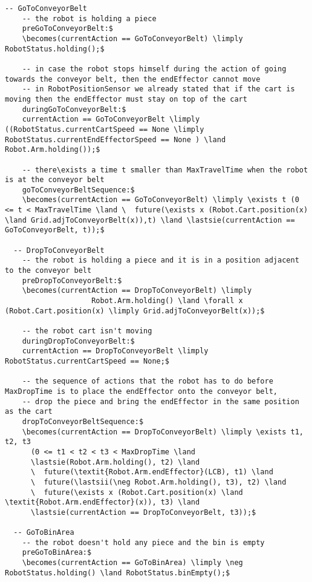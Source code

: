 \begin{lstlisting}[fontadjust, mathescape, frame=single]
  -- GoToConveyorBelt
    -- the robot is holding a piece
    preGoToConveyorBelt:$
    \becomes(currentAction == GoToConveyorBelt) \limply RobotStatus.holding();$
    
    -- in case the robot stops himself during the action of going towards the conveyor belt, then the endEffector cannot move
    -- in RobotPositionSensor we already stated that if the cart is moving then the endEffector must stay on top of the cart
    duringGoToConveyorBelt:$
    currentAction == GoToConveyorBelt \limply ((RobotStatus.currentCartSpeed == None \limply RobotStatus.currentEndEffectorSpeed == None ) \land Robot.Arm.holding());$

    -- there\exists a time t smaller than MaxTravelTime when the robot is at the conveyor belt
    goToConveyorBeltSequence:$
    \becomes(currentAction == GoToConveyorBelt) \limply \exists t (0 <= t < MaxTravelTime \land \  future(\exists x (Robot.Cart.position(x) \land Grid.adjToConveyorBelt(x)),t) \land \lastsie(currentAction == GoToConveyorBelt, t));$
    
  -- DropToConveyorBelt
    -- the robot is holding a piece and it is in a position adjacent to the conveyor belt
    preDropToConveyorBelt:$
    \becomes(currentAction == DropToConveyorBelt) \limply
                    Robot.Arm.holding() \land \forall x (Robot.Cart.position(x) \limply Grid.adjToConveyorBelt(x));$
    
    -- the robot cart isn't moving
    duringDropToConveyorBelt:$
    currentAction == DropToConveyorBelt \limply RobotStatus.currentCartSpeed == None;$

    -- the sequence of actions that the robot has to do before MaxDropTime is to place the endEffector onto the conveyor belt,
    -- drop the piece and bring the endEffector in the same position as the cart
    dropToConveyorBeltSequence:$
    \becomes(currentAction == DropToConveyorBelt) \limply \exists t1, t2, t3
      (0 <= t1 < t2 < t3 < MaxDropTime \land
      \lastsie(Robot.Arm.holding(), t2) \land
      \  future(\textit{Robot.Arm.endEffector}(LCB), t1) \land
      \  future(\lastsii(\neg Robot.Arm.holding(), t3), t2) \land
      \  future(\exists x (Robot.Cart.position(x) \land \textit{Robot.Arm.endEffector}(x)), t3) \land
      \lastsie(currentAction == DropToConveyorBelt, t3));$

  -- GoToBinArea
    -- the robot doesn't hold any piece and the bin is empty
    preGoToBinArea:$
    \becomes(currentAction == GoToBinArea) \limply \neg RobotStatus.holding() \land RobotStatus.binEmpty();$
    

\end{lstlisting}
